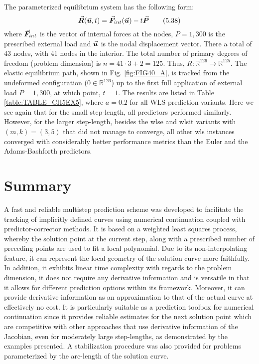 \clearpage
 The 
parameterized 
equilibrium system has the following form:
\begin{equation}
	\vec{\bm{R}}(\vec{\bm{u}},t)=\vec{\bm{F}}_{int}(\vec{\bm{u}})-t \vec{\bm{P}}
	\tag{5.38}\label{eq:P4}
\end{equation}
where $\vec{\bm{F}}_{int}$ is the vector of internal forces at the nodes, $P=1,300$ 
is the
prescribed external load and $\vec{\bm{u}}$ is the nodal
displacement vector. There a total of 43 nodes, with 41 nodes in the interior. 
The total number of primary degrees of
freedom (problem dimension) is $n=41\cdot 3+2=125$. Thus,
$R:\mathbb{R}^{126}\rightarrow\mathbb{R}^{125}$. The elastic equilibrium path, 
shown in 
Fig. \ref{fig:FIG40_A}, is tracked from
the undeformed configuration ($0\in\mathbb{R}^{126}$) up to the first full 
application of external load $P=1,300$, at which point, $t=1$. The results are
listed in Table \ref{table:TABLE_CH5EX5}, where $a=0.2$ for all WLS prediction 
variants. Here we see again that for the small step-length, all predictors 
performed similarly. However, for the larger step-length, besides the 
\acrshort{wlse} and \acrshort{wlsit} variants with $(m,k)=(3,5)$ that did not 
manage to converge, all other \acrshort{wls} instances converged with 
considerably better performance metrics than the Euler and the 
Adams-Bashforth predictors. 


\section{Summary}

A fast and reliable multistep prediction scheme was developed to
facilitate the tracking of implicitly defined curves using numerical
continuation coupled with predictor-corrector methods. It is based
on a weighted least squares process, whereby the solution point at the current
step, along with a prescribed number of preceding points are used to fit a
local polynomial. Due to its non-interpolating feature, it can represent the 
local
geometry of the solution curve more faithfully. In addition, it exhibits linear
time complexity with regards to the problem dimension, it does not
require any derivative information and is versatile in
that it allows for different prediction options within its framework. Moreover,
it can provide derivative information as an approximation to that of the actual 
curve at effectively no cost. It is particularly suitable as a prediction
toolbox for numerical continuation since it provides reliable estimates for the 
next
solution point which are competitive with other approaches that use derivative 
information of the Jacobian, even for moderately large step-lengths, as
demonstrated by the examples presented. A
stabilization procedure was also provided for problems parameterized by the 
arc-length of the solution curve.  

